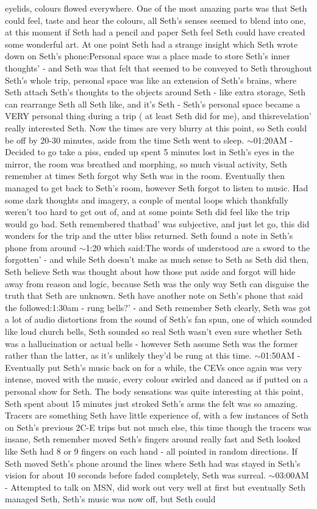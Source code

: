 \documentclass[12pt]{book}
\begin{document}
eyelids, colours flowed everywhere. One of the most amazing parts was that Seth could feel, taste and hear the colours, all Seth's senses seemed to blend into one, at this moment if Seth had a pencil and paper Seth feel Seth could have created some wonderful art. At one point Seth had a strange insight which Seth wrote down on Seth's phone:Personal space was a place made to store Seth's inner thoughts' - and Seth was that felt that seemed to be conveyed to Seth throughout Seth's whole trip, personal space was like an extension of Seth's brains, where Seth attach Seth's thoughts to the objects around Seth - like extra storage, Seth can rearrange Seth all Seth like, and it's Seth - Seth's personal space became a VERY personal thing during a trip ( at least Seth did for me), and thisrevelation' really interested Seth. Now the times are very blurry at this point, so Seth could be off by 20-30 minutes, aside from the time Seth went to sleep. $\sim$01:20AM - Decided to go take a piss, ended up spent 5 minutes lost in Seth's eyes in the mirror, the room was breathed and morphing, so much visual activity, Seth remember at times Seth forgot why Seth was in the room. Eventually then managed to get back to Seth's room, however Seth forgot to listen to music. Had some dark thoughts and imagery, a couple of mental loops which thankfully weren't too hard to get out of, and at some points Seth did feel like the trip would go bad. Seth remembered thatbad' was subjective, and just let go, this did wonders for the trip and the utter bliss returned. Seth found a note in Seth's phone from around $\sim$1:20 which said:The words of understood are a sword to the forgotten' - and while Seth doesn't make as much sense to Seth as Seth did then, Seth believe Seth was thought about how those put aside and forgot will hide away from reason and logic, because Seth was the only way Seth can disguise the truth that Seth are unknown. Seth have another note on Seth's phone that said the followed:1:30am - rung bells?' - and Seth remember Seth clearly, Seth was got a lot of audio distortions from the sound of Seth's fan spun, one of which sounded like loud church bells, Seth sounded so real Seth wasn't even sure whether Seth was a hallucination or actual bells - however Seth assume Seth was the former rather than the latter, as it's unlikely they'd be rung at this time. $\sim$01:50AM - Eventually put Seth's music back on for a while, the CEVs once again was very intense, moved with the music, every colour swirled and danced as if putted on a personal show for Seth. The body sensations was quite interesting at this point, Seth spent about 15 minutes just stroked Seth's arms the felt was so amazing. Tracers are something Seth have little experience of, with a few instances of Seth on Seth's previous 2C-E trips but not much else, this time though the tracers was insane, Seth remember moved Seth's fingers around really fast and Seth looked like Seth had 8 or 9 fingers on each hand - all pointed in random directions. If Seth moved Seth's phone around the lines where Seth had was stayed in Seth's vision for about 10 seconds before faded completely, Seth was surreal. $\sim$03:00AM - Attempted to talk on MSN, did work out very well at first but eventually Seth managed Seth, Seth's music was now off, but Seth could 
\end{document}
